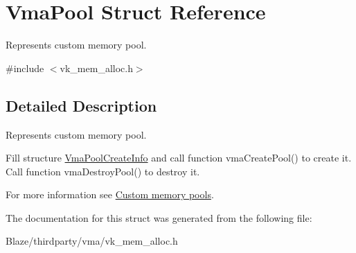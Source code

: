 \hypertarget{structVmaPool}{}\section{Vma\+Pool Struct Reference}
\label{structVmaPool}


Represents custom memory pool.  




{\ttfamily \#include $<$vk\+\_\+mem\+\_\+alloc.\+h$>$}



\subsection{Detailed Description}
Represents custom memory pool. 

Fill structure \hyperlink{structVmaPoolCreateInfo}{Vma\+Pool\+Create\+Info} and call function vma\+Create\+Pool() to create it. Call function vma\+Destroy\+Pool() to destroy it.

For more information see \hyperlink{choosing_memory_type_choosing_memory_type_custom_memory_pools}{Custom memory pools}. 

The documentation for this struct was generated from the following file\+:\begin{DoxyCompactItemize}
\item 
Blaze/thirdparty/vma/vk\+\_\+mem\+\_\+alloc.\+h\end{DoxyCompactItemize}
